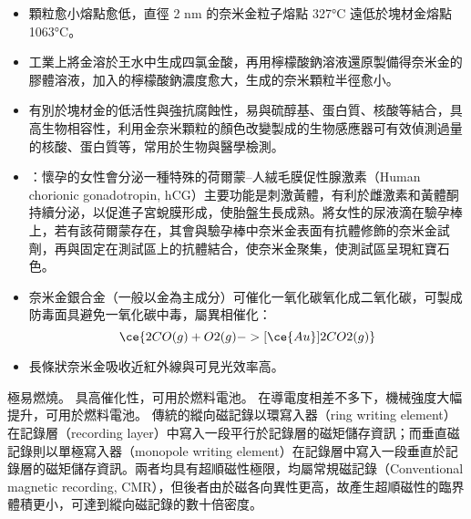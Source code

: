 \documentclass[a4paper,12pt]{report}
\begin{document}
\begin{itemize}
\begin{itemize}
\begin{itemize}
\begin{itemize}
\item 顆粒愈小熔點愈低，直徑 2 nm 的奈米金粒子熔點 327°C 遠低於塊材金熔點 1063°C。
\item 工業上將金溶於王水中生成四氯金酸，再用檸檬酸鈉溶液還原製備得奈米金的膠體溶液，加入的檸檬酸鈉濃度愈大，生成的奈米顆粒半徑愈小。
\item 有別於塊材金的低活性與強抗腐蝕性，易與硫醇基、蛋白質、核酸等結合，具高生物相容性，利用金奈米顆粒的顏色改變製成的生物感應器可有效偵測過量的核酸、蛋白質等，常用於生物與醫學檢測。
\item {}：懷孕的女性會分泌一種特殊的荷爾蒙–人絨毛膜促性腺激素（Human chorionic gonadotropin, hCG）主要功能是刺激黃體，有利於雌激素和黃體酮持續分泌，以促進子宮蛻膜形成，使胎盤生長成熟。將女性的尿液滴在驗孕棒上，若有該荷爾蒙存在，其會與驗孕棒中奈米金表面有抗體修飾的奈米金試劑，再與固定在測試區上的抗體結合，使奈米金聚集，使測試區呈現紅寶石色。
\item 奈米金銀合金（一般以金為主成分）可催化一氧化碳氧化成二氧化碳，可製成防毒面具避免一氧化碳中毒，屬異相催化：
\[\ce{2CO(g) + O2(g) -> [\ce{Au}] 2CO2(g)}\]
\item 長條狀奈米金吸收近紅外線與可見光效率高。
\end{itemize}
極易燃燒。
具高催化性，可用於燃料電池。
在導電度相差不多下，機械強度大幅提升，可用於燃料電池。
\bct\bfH\ctr{}\ef\FB\ect
傳統的縱向磁記錄以環寫入器（ring writing element）在記錄層（recording layer）中寫入一段平行於記錄層的磁矩儲存資訊；而垂直磁記錄則以單極寫入器（monopole writing element）在記錄層中寫入一段垂直於記錄層的磁矩儲存資訊。兩者均具有超順磁性極限，均屬常規磁記錄（Conventional magnetic recording, CMR），但後者由於磁各向異性更高，故產生超順磁性的臨界體積更小，可達到縱向磁記錄的數十倍密度。


\end{itemize}
\end{itemize}
\end{itemize}
\end{document}
